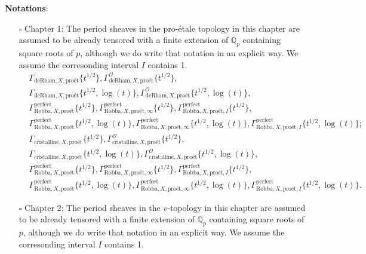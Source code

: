\documentclass[12pt]{book}
\theoremstyle{definition}
\begin{document}
\noindent \textbf{Notations}:
\begin{itemize}
\item[$\square$] Chapter 1: The period sheaves in the pro-\'etale topology in this chapter are assumed to be already tensored with a finite extension of $\mathbb{Q}_p$ containing square roots of $p$, although we do write that notation in an explicit way. We assume the corresonding interval $I$ contains 1. 
\begin{align}
&\Gamma_{\text{deRham},X,\text{pro\'et}}\{t^{1/2}\},\Gamma^\mathcal{O}_{\text{deRham},X,\text{pro\'et}}\{t^{1/2}\},\\
&\Gamma_{\text{deRham},X,\text{pro\'et}}\{t^{1/2},\log(t)\},\Gamma^\mathcal{O}_{\text{deRham},X,\text{pro\'et}}\{t^{1/2},\log(t)\},\\
&\Gamma^\mathrm{perfect}_{\text{Robba},X,\text{pro\'et}}\{t^{1/2}\},\Gamma^\mathrm{perfect}_{\text{Robba},X,\text{pro\'et},\infty}\{t^{1/2}\},\Gamma^\mathrm{perfect}_{\text{Robba},X,\text{pro\'et},I}\{t^{1/2}\},\\
&\Gamma^\mathrm{perfect}_{\text{Robba},X,\text{pro\'et}}\{t^{1/2},\log(t)\},\Gamma^\mathrm{perfect}_{\text{Robba},X,\text{pro\'et},\infty}\{t^{1/2},\log(t)\},\Gamma^\mathrm{perfect}_{\text{Robba},X,\text{pro\'et},I}\{t^{1/2},\log(t)\};
\end{align} 
\begin{align}
&\Gamma_{\text{cristalline},X,\text{pro\'et}}\{t^{1/2}\},\Gamma^\mathcal{O}_{\text{cristalline},X,\text{pro\'et}}\{t^{1/2}\},\\
&\Gamma_{\text{cristalline},X,\text{pro\'et}}\{t^{1/2},\log(t)\},\Gamma^\mathcal{O}_{\text{cristalline},X,\text{pro\'et}}\{t^{1/2},\log(t)\},\\
&\Gamma^\mathrm{perfect}_{\text{Robba},X,\text{pro\'et}}\{t^{1/2}\},\Gamma^\mathrm{perfect}_{\text{Robba},X,\text{pro\'et},\infty}\{t^{1/2}\},\Gamma^\mathrm{perfect}_{\text{Robba},X,\text{pro\'et},I}\{t^{1/2}\},\\
&\Gamma^\mathrm{perfect}_{\text{Robba},X,\text{pro\'et}}\{t^{1/2},\log(t)\},\Gamma^\mathrm{perfect}_{\text{Robba},X,\text{pro\'et},\infty}\{t^{1/2},\log(t)\},\Gamma^\mathrm{perfect}_{\text{Robba},X,\text{pro\'et},I}\{t^{1/2},\log(t)\}.
\end{align}
\item[$\square$] Chapter 2: The period sheaves in the $v$-topology in this chapter are assumed to be already tensored with a finite extension of $\mathbb{Q}_p$ containing square roots of $p$, although we do write that notation in an explicit way. We assume the corresonding interval $I$ contains 1.

\end{itemize}
\end{document}
